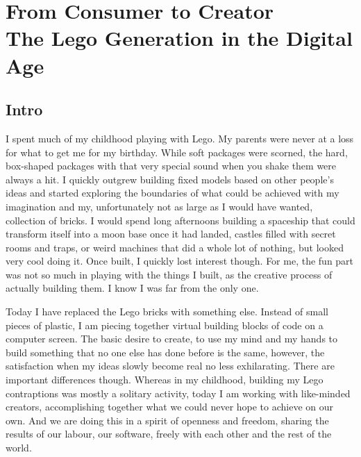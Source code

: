 \begin{savequote}
\end{savequote}
\chapter[From Consumer to Creator]{From Consumer to Creator\\ \Large{The Lego Generation in the Digital Age}}
\label{c:consumer_to_creator}

\section{Intro}
\label{s:consumer_to_creator:intro}

I spent much of my childhood playing with Lego. My parents were never at a loss
for what to get me for my birthday. While soft packages were scorned, the hard,
box-shaped packages with that very special sound when you shake them were always
a hit. I quickly outgrew building f\hbox{}ixed models based on other people's
ideas and started exploring the boundaries of what could be achieved with my
imagination and my, unfortunately not as large as I would have wanted,
collection of bricks. I would spend long afternoons building a spaceship that
could transform itself into a moon base once it had landed, castles
f\hbox{}illed with secret rooms and traps, or weird machines that did a whole
lot of nothing, but looked very cool doing it. Once built, I quickly lost
interest though. For me, the fun part was not so much in playing with the things
I built, as the creative process of actually building them. I know I was far
from the only one.

Today I have replaced the Lego bricks with something else. Instead of small
pieces of plastic, I am piecing together virtual building blocks of code on a
computer screen. The basic desire to create, to use my mind and my hands to
build something that no one else has done before is the same, however, the
satisfaction when my ideas slowly become real no less exhilarating. There are
important dif\hbox{}ferences though. Whereas in my childhood, building my Lego
contraptions was mostly a solitary activity, today I am working with like-minded
creators, accomplishing together what we could never hope to achieve on our own.
And we are doing this in a spirit of openness and freedom, sharing the results
of our labour, our software, freely with each other and the rest of the world. 


